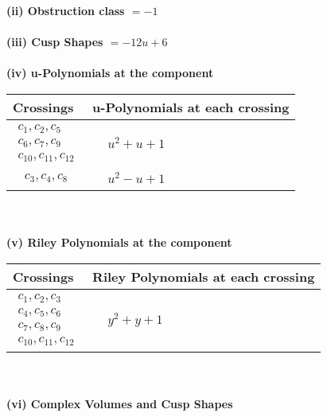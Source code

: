 \documentclass[1p]{elsarticle_modified}
\theoremstyle{definition}
\begin{document}
\flushleft \textbf{(ii) Obstruction class $= -1$}\\~\\
\flushleft \textbf{(iii) Cusp Shapes $= -12 u+6$}\\~\\
\newpage\renewcommand{\arraystretch}{1}
\flushleft \textbf{(iv) u-Polynomials at the component}\newline \\
\begin{tabular}{m{50pt}|m{274pt}}
Crossings & \hspace{64pt}u-Polynomials at each crossing \\
\hline $$\begin{aligned}c_{1},c_{2},c_{5}\\c_{6},c_{7},c_{9}\\c_{10},c_{11},c_{12}\end{aligned}$$&$\begin{aligned}
&u^2+u+1
\end{aligned}$\\
\hline $$\begin{aligned}c_{3},c_{4},c_{8}\end{aligned}$$&$\begin{aligned}
&u^2- u+1
\end{aligned}$\\
\hline
\end{tabular}\\~\\
\newpage\renewcommand{\arraystretch}{1}
\flushleft \textbf{(v) Riley Polynomials at the component}\newline \\
\begin{tabular}{m{50pt}|m{274pt}}
Crossings & \hspace{64pt}Riley Polynomials at each crossing \\
\hline $$\begin{aligned}c_{1},c_{2},c_{3}\\c_{4},c_{5},c_{6}\\c_{7},c_{8},c_{9}\\c_{10},c_{11},c_{12}\end{aligned}$$&$\begin{aligned}
&y^2+y+1
\end{aligned}$\\
\hline
\end{tabular}\\~\\
\newpage\flushleft \textbf{(vi) Complex Volumes and Cusp Shapes}
\end{document}
